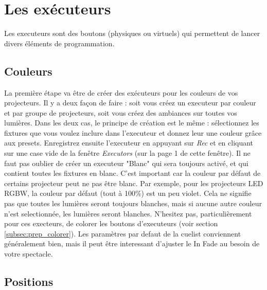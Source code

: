 \section{Les exécuteurs}
\label{sec:executeurs}

Les executeurs sont des boutons (physiques ou virtuels) qui permettent de lancer divers éléments de programmation.

\subsection{Couleurs}
\label{subsec:exec_couleurs}

La première étape va être de créer des exécuteurs pour les couleurs de vos projecteurs.
\newline
Il y a deux façon de faire : soit vous créez un executeur par couleur et par groupe de projecteurs, soit vous créez des ambiances sur toutes vos lumières.
\newline
\newline
Dans les deux cas, le principe de création est le même : sélectionnez les fixtures que vous voulez inclure dans l'executeur et donnez leur une couleur grâce aux presets. Enregistrez ensuite l'executeur en appuyant sur \textit{Rec} et en cliquant sur une case vide de la fenêtre \textit{Executors} (sur la page 1 de cette fenêtre).
\newline
\newline
Il ne faut pas oublier de créer un executeur "Blanc" qui sera toujours activé, et qui contient toutes les fixtures en blanc. C'est important car la couleur par défaut
de certains projecteur peut ne pas être blanc. Par exemple, pour les projecteurs LED RGBW, la couleur par défaut (tout à 100\%) est un peu violet.
\newline
Cela ne signifie pas que toutes les lumières seront toujours blanches, mais si aucune autre couleur n'est selectionnée, les lumières seront blanches.
\newline
\newline
N'hesitez pas, particulièrement pour ces execteurs, de colorer les boutons d'executeurs (voir section \ref{subsec:prep_colorer}).
\newline
\newline
Les paramètres par defaut de la cuelist conviennent généralement bien, mais il peut être interessant d'ajuster le In Fade au besoin de votre spectacle.

\subsection{Positions}
\label{subsec:exec_positions}

